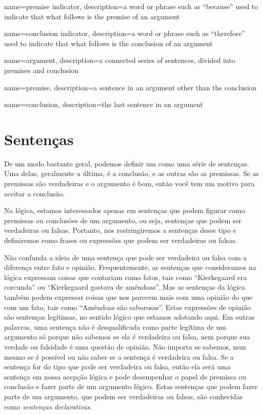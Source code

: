 

{
name=premise indicator,
description={a word or phrase such as ``because'' used to indicate that what follows is the premise of an argument}
}

{
name=conclusion indicator,
description={a word or phrase such as ``therefore'' used to indicate that what follows is the conclusion of an argument}
}

{
name=argument,
description={a connected series of sentences, divided into \gls{premise}s and \gls{conclusion}}
}

{
name=premise,
description={a sentence in an \gls{argument} other than the \gls{conclusion}}
}

{
name=conclusion,
description={the last sentence in an \gls{argument}}
}


\section{Sentenças}
\label{intro.sentences}

De um modo bastante geral, podemos definir um  como uma série de sentenças.
Uma delas, geralmente a última, é a conclusão, e as outras são as premissas.
Se as premissas são verdadeiras e o argumento é bom, então você tem um motivo para aceitar a conclusão.

Na lógica, estamos interessados apenas em sentenças que podem figurar como premissas ou conclusões de um argumento, ou seja, sentenças que podem ser verdadeiras ou falsas.
Portanto, nos restringiremos a sentenças desse tipo e definiremos  como frases ou expressões que podem ser verdadeiras ou falsas.

Não confunda a ideia de uma sentença que pode ser verdadeira ou falsa com a diferença entre fato e opinião.
Frequentemente, as sentenças que consideramos na lógica expressam coisas que contariam como fatos, tais como ``Kierkegaard era corcunda'' ou ``Kierkegaard gostava de amêndoas''.
Mas as sentenças da lógica também podem expressar coisas que nos parecem mais com uma opinião do que com um fato, tais como ``Amêndoas são saborosas''.
Estas expressões de opinião são sentenças legítimas, no sentido lógico que estamos adotando aqui.
Em outras palavras, uma sentença não é desqualificada como parte legítima de um argumento só porque não sabemos se ela é verdadeira ou falsa, nem porque sua verdade ou falsidade é uma questão de opinião.
Não importa se sabemos, nem mesmo se é possível ou não saber se a sentença é verdadeira ou falsa.
Se a sentença for do tipo que pode ser verdadeira ou falsa, então ela será uma sentença em nossa acepção lógica  e pode desempenhar o papel de premissa ou conclusão e fazer parte de um argumento lógico.
Estas sentenças que podem fazer parte de um argumento, que podem ser verdadeiras ou falsas, são conhecidas como \emph{sentenças declarativas}.

